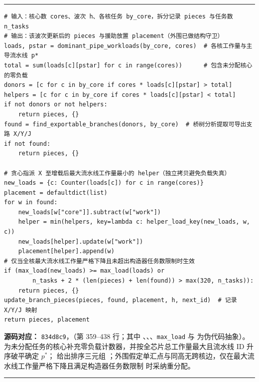 \documentclass[anonymous,withtoc]{gmcm2026}
\begin{document}
\par{}\begingroup\normalsize
\captionsetup{type=algorithm,position=top,justification=raggedright,singlelinecheck=false,labelfont=bf}
\label{alg:p1-branch-aid}
\nopagebreak\hrule\nopagebreak


\begin{lstlisting}[style=paperpseudo]
# 输入：核心数 cores、波次 h、各核任务 by_core，拆分记录 pieces 与任务数 n_tasks
# 输出：该波次更新后的 pieces 与援助放置 placement（外围已做结构守卫）
loads, pstar = dominant_pipe_workloads(by_core, cores)  # 各核工作量与主导流水线 p*
total = sum(loads[c][pstar] for c in range(cores))      # 包含未分配核心的零负载
donors = [c for c in by_core if cores * loads[c][pstar] > total]
helpers = [c for c in by_core if cores * loads[c][pstar] < total]
if not donors or not helpers:
    return pieces, {}
found = find_exportable_branches(donors, by_core)  # 桥树分析提取可导出支路 X/Y/J
if not found:
    return pieces, {}

# 贪心指派 X 至增载后最大流水线工作量最小的 helper（独立拷贝避免负载失真）
new_loads = {c: Counter(loads[c]) for c in range(cores)}
placement = defaultdict(list)
for w in found:
    new_loads[w["core"]].subtract(w["work"])
    helper = min(helpers, key=lambda c: helper_load_key(new_loads, w, c))
    new_loads[helper].update(w["work"])
    placement[helper].append(w)
# 仅当全核最大流水线工作量严格下降且未超出构造器任务数限制时生效
if (max_load(new_loads) >= max_load(loads) or
        n_tasks + 2 * (len(pieces) + len(found)) > max(320, n_tasks)):
    return pieces, {}
update_branch_pieces(pieces, found, placement, h, next_id)  # 记录 X/Y/J 映射
return pieces, placement
\end{lstlisting}
\textbf{源码对应：} \texttt{834d8c9}，\texttt{}（第 359--438 行；其中 \texttt{}、\texttt{}、\texttt{}、\texttt{max\_load} 与 \texttt{} 为伪代码抽象）。\texttt{} 为未分配任务的核心补充零负载计数器，并按全芯片总工作量最大且流水线 ID 升序破平确定 \(p^*\)；\texttt{} 给出排序三元组 \texttt{}；外围假定单汇点与同高无跨核边，仅在最大流水线工作量严格下降且满足构造器任务数限制 \texttt{} 时采纳重分配。

\par\hrule\endgroup
\end{document}
